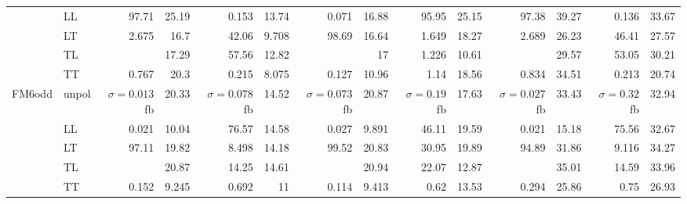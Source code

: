 \begin{table}[h]
{\begin{tabular}{llrrrrrrrrrrrr}
 & LL & \num{97.71} & \num{25.19} & \num{0.153} & \num{13.74} & \num{0.071} & \num{16.88} & \num{95.95} & \num{25.15} & \num{97.38} & \num{39.27} & \num{0.136} & \num{33.67} \\
 & LT & \num{2.675} & \num{16.7} & \num{42.06} & \num{9.708} & \num{98.69} & \num{16.64} & \num{1.649} & \num{18.27} & \num{2.689} & \num{26.23} & \num{46.41} & \num{27.57} \\
 & TL &  & \num{17.29} & \num{57.56} & \num{12.82} &  & \num{17} & \num{1.226} & \num{10.61} &  & \num{29.57} & \num{53.05} & \num{30.21} \\
 & TT & \num{0.767} & \num{20.3} & \num{0.215} & \num{8.075} & \num{0.127} & \num{10.96} & \num{1.14} & \num{18.56} & \num{0.834} & \num{34.51} & \num{0.213} & \num{20.74} \\
\midrule
\multirow{5}{*}{FM6odd}
 & unpol & $\sigma = \num{0.013}$ fb & \num{20.33} & $\sigma = \num{0.078}$ fb & \num{14.52} & $\sigma = \num{0.073}$ fb & \num{20.87} & $\sigma = \num{0.19}$ fb & \num{17.63} & $\sigma = \num{0.027}$ fb & \num{33.43} & $\sigma = \num{0.32}$ fb & \num{32.94} \\
 & LL & \num{0.021} & \num{10.04} & \num{76.57} & \num{14.58} & \num{0.027} & \num{9.891} & \num{46.11} & \num{19.59} & \num{0.021} & \num{15.18} & \num{75.56} & \num{32.67} \\
 & LT & \num{97.11} & \num{19.82} & \num{8.498} & \num{14.18} & \num{99.52} & \num{20.83} & \num{30.95} & \num{19.89} & \num{94.89} & \num{31.86} & \num{9.116} & \num{34.27} \\
 & TL &  & \num{20.87} & \num{14.25} & \num{14.61} &  & \num{20.94} & \num{22.07} & \num{12.87} &  & \num{35.01} & \num{14.59} & \num{33.96} \\
 & TT & \num{0.152} & \num{9.245} & \num{0.692} & \num{11} & \num{0.114} & \num{9.413} & \num{0.62} & \num{13.53} & \num{0.294} & \num{25.86} & \num{0.75} & \num{26.93} \\
\bottomrule
\end{tabular}
}%
\end{table}